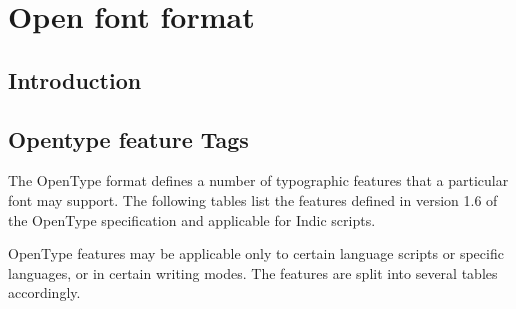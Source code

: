 \chapter{Open font format}

\section{Introduction}
\section {Opentype feature Tags}
The OpenType format defines a number of typographic features that a particular font may support.
The following tables list the features defined in version 1.6 of the OpenType specification and
applicable for Indic scripts.

OpenType features may be applicable only to certain language scripts or specific languages, 
or in certain writing modes. The features are split into several tables accordingly.

